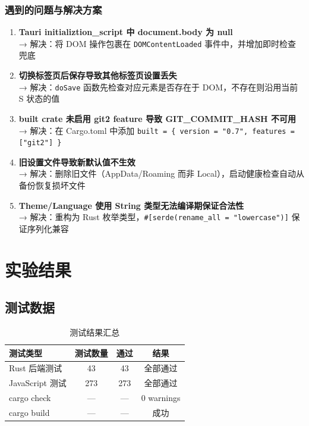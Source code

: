 \documentclass[12pt,a4paper]{ctexart}
\begin{document}
\subsubsection{遇到的问题与解决方案}

\begin{enumerate}[label=(\arabic*)]
  \item \textbf{Tauri initializtion\_script 中 document.body 为 null}
    \\→ 解决：将 DOM 操作包裹在 \texttt{DOMContentLoaded} 事件中，并增加即时检查兜底

  \item \textbf{切换标签页后保存导致其他标签页设置丢失}
    \\→ 解决：\texttt{doSave} 函数先检查对应元素是否存在于 DOM，不存在则沿用当前 S 状态的值

  \item \textbf{built crate 未启用 git2 feature 导致 GIT\_COMMIT\_HASH 不可用}
    \\→ 解决：在 Cargo.toml 中添加 \texttt{built = \{ version = "0.7", features = ["git2"] \}}

  \item \textbf{旧设置文件导致新默认值不生效}
    \\→ 解决：删除旧文件（AppData/Roaming 而非 Local），启动健康检查自动从备份恢复损坏文件

  \item \textbf{Theme/Language 使用 String 类型无法编译期保证合法性}
    \\→ 解决：重构为 Rust 枚举类型，\texttt{\#[serde(rename\_all = "lowercase")]} 保证序列化兼容
\end{enumerate}

\section{实验结果}

\subsection{测试数据}

\begin{table}[H]
\centering
\begin{tabular}{lccc}
\toprule
测试类型 & 测试数量 & 通过 & 结果 \\
\midrule
Rust 后端测试 & 43 & 43 & 全部通过 \\
JavaScript 测试 & 273 & 273 & 全部通过 \\
cargo check & --- & --- & 0 warnings \\
cargo build & --- & --- & 成功 \\
\bottomrule
\end{tabular}
\caption{测试结果汇总}
\end{table}
\end{document}
